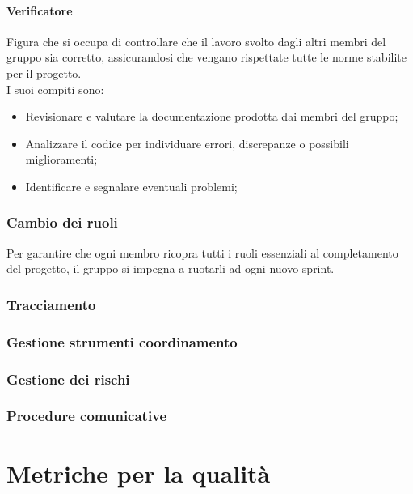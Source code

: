 \documentclass[10pt]{article}
\begin{document}
\begin{justify}
        \paragraph{Verificatore}
        Figura che si occupa di controllare che il lavoro svolto dagli altri membri del gruppo sia corretto, assicurandosi che vengano rispettate tutte le norme stabilite per il progetto.\\
        I suoi compiti sono:
        \begin{itemize}
            \item Revisionare e valutare la documentazione prodotta dai membri del gruppo;
            \item Analizzare il codice per individuare errori, discrepanze o possibili miglioramenti;
            \item Identificare e segnalare eventuali problemi;
        \end{itemize}

    \subsubsection{Cambio dei ruoli}
    Per garantire che ogni membro ricopra tutti i ruoli essenziali al completamento del progetto, il gruppo si impegna a ruotarli ad ogni nuovo sprint.\\

    \subsubsection{Tracciamento}

    \subsubsection{Gestione strumenti coordinamento}

    \subsubsection{Gestione dei rischi}

    \subsubsection{Procedure comunicative}

\newpage
\section{Metriche per la qualità}

        
        

\end{justify}
\end{document}

